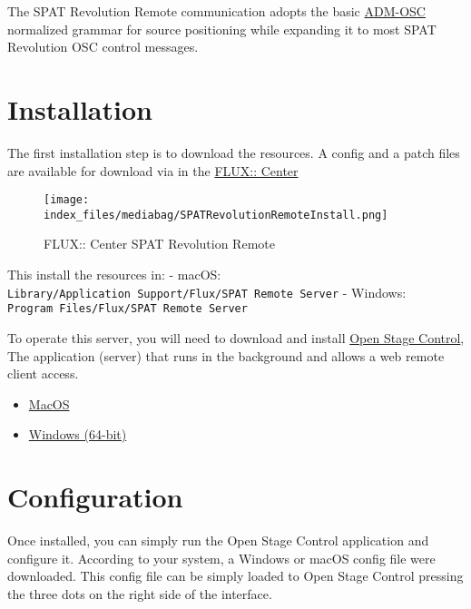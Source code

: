 \documentclass[
  letterpaper,
  DIV=11,
  numbers=noendperiod]{scrreport}
\providecommand{\tightlist}{%
  \setlength{\itemsep}{0pt}\setlength{\parskip}{0pt}}\usepackage{longtable,booktabs,array}
\begin{document}
The SPAT Revolution Remote communication adopts the basic
\href{https://doc.flux.audio/\#/en_US/spat_revolution_doc/Ecosystem_\&_integration_ADM_OSC?id=adm-osc}{ADM-OSC}
normalized grammar for source positioning while expanding it to most
SPAT Revolution OSC control messages.

\hypertarget{installation-2}{%
\section{Installation}\label{installation-2}}

The first installation step is to download the resources. A config and a
patch files are available for download via in the
\href{https://www.flux.audio/download/}{FLUX:: Center}

\begin{figure}

{\centering \texttt{[image: index\_files/mediabag/SPATRevolutionRemoteInstall.png]}

}

\caption{FLUX:: Center SPAT Revolution Remote}

\end{figure}

This install the resources in: - macOS:
\texttt{Library/Application\ Support/Flux/SPAT\ Remote\ Server} -
Windows: \texttt{Program\ Files/Flux/SPAT\ Remote\ Server}

To operate this server, you will need to download and install
\href{https://openstagecontrol.ammd.net/}{Open Stage Control}, The
application (server) that runs in the background and allows a web remote
client access.

\begin{itemize}
\tightlist
\item
  \href{https://github.com/jean-emmanuel/open-stage-control/releases/download/v1.17.0/open-stage-control-1.17.0-osx.zip}{MacOS}
\item
  \href{https://github.com/jean-emmanuel/open-stage-control/releases/download/v1.17.0/open-stage-control-1.17.0-win32-x64.zip}{Windows
  (64-bit)}
\end{itemize}

\hypertarget{configuration}{%
\section{Configuration}\label{configuration}}

Once installed, you can simply run the Open Stage Control application
and configure it. According to your system, a Windows or macOS config
file were downloaded. This config file can be simply loaded to Open
Stage Control pressing the three dots on the right side of the
interface.
\end{document}
